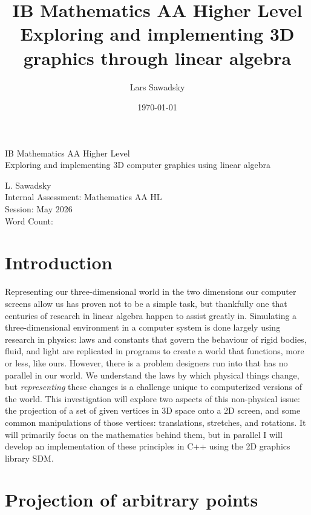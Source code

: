 \documentclass[12pt, a4paper]{article}
\title{ IB Mathematics AA Higher Level\\
    
    Exploring and implementing 3D graphics through linear
algebra }
\author{Lars Sawadsky}
\date{\today}
\begin{document}
    \begin{titlepage}
        \begin{center}
            \vspace*{9cm}

            IB Mathematics AA Higher Level\\
            \medskip
            Exploring and implementing 3D computer graphics
            using linear algebra

            \vspace{8cm}

            L. Sawadsky\\
            Internal Assessment: Mathematics AA HL\\
            Session: May 2026\\
            Word Count:
        \end{center}
        \newpage
    \end{titlepage}

    \tableofcontents
    \newpage

    \section{Introduction}
    
    
    Representing our three-dimensional world in the two
    dimensions our computer screens allow us has proven not to
    be a simple task, but thankfully one that centuries of
    research in linear algebra happen to assist greatly in.
    Simulating a three-dimensional environment in a computer
    system is done largely using research in physics: laws and
    constants that govern the behaviour of rigid bodies, fluid,
    and light are replicated in programs to create a world that
    functions, more or less, like ours. However, there is a
    problem designers run into that has no parallel in our
    world. We understand the laws by which physical things
    change, but \textit{representing} these changes is a
    challenge unique to computerized versions of the world. This
    investigation will explore two aspects of this non-physical
    issue: the projection of a set of given vertices in 3D space
    onto a 2D screen, and some common manipulations of those
    vertices: translations, stretches, and rotations. It will
    primarily focus on the mathematics behind them, but in
    parallel I will develop an implementation of these
    principles in C++ using the 2D graphics library SDM.

    \section{Projection of arbitrary points}
    
\end{document}

